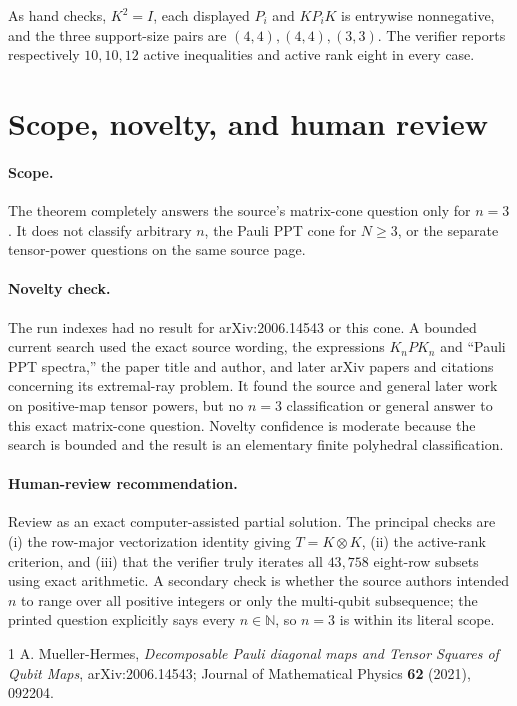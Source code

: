 \documentclass[11pt]{article}
\begin{document}
As hand checks, $K^2=I$, each displayed $P_i$ and $KP_iK$ is entrywise
nonnegative, and the three support-size pairs are $(4,4),(4,4),(3,3)$.
The verifier reports respectively $10,10,12$ active inequalities and active
rank eight in every case.

\section*{Scope, novelty, and human review}

\paragraph{Scope.}
The theorem completely answers the source's matrix-cone question only for
$n=3$.  It does not classify arbitrary $n$, the Pauli PPT cone for $N\geq3$,
or the separate tensor-power questions on the same source page.

\paragraph{Novelty check.}
The run indexes had no result for arXiv:2006.14543 or this cone.  A bounded
current search used the exact source wording, the expressions $K_nPK_n$ and
``Pauli PPT spectra,'' the paper title and author, and later arXiv papers and
citations concerning its extremal-ray problem.  It found the source and
general later work on positive-map tensor powers, but no $n=3$ classification
or general answer to this exact matrix-cone question.  Novelty confidence is
moderate because the search is bounded and the result is an elementary finite
polyhedral classification.

\paragraph{Human-review recommendation.}
Review as an exact computer-assisted partial solution.  The principal checks
are (i) the row-major vectorization identity giving $T=K\otimes K$,
(ii) the active-rank criterion, and (iii) that the verifier truly iterates all
$43{,}758$ eight-row subsets using exact arithmetic.  A secondary check is
whether the source authors intended $n$ to range over all positive integers
or only the multi-qubit subsequence; the printed question explicitly says
every $n\in\mathbb N$, so $n=3$ is within its literal scope.

\begin{thebibliography}{1}
A. Mueller-Hermes,
\emph{Decomposable Pauli diagonal maps and Tensor Squares of Qubit Maps},
arXiv:2006.14543; Journal of Mathematical Physics \textbf{62} (2021), 092204.
\end{thebibliography}
\end{document}
